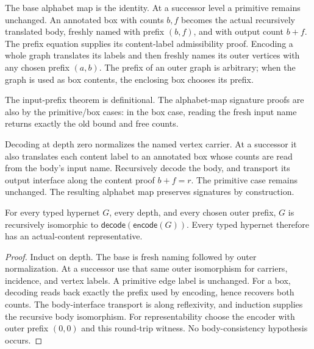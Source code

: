 \begin{definition}[Encoding]
The base alphabet map is the identity. At a successor level a primitive remains
unchanged. An annotated box with counts $b,f$ becomes the actual recursively
translated body, freshly named with prefix $(b,f)$, and with output count $b+f$.
The prefix equation supplies its content-label admissibility proof. Encoding a
whole graph translates its labels and then freshly names its outer vertices
with any chosen prefix $(a,b)$. The prefix of an outer graph is arbitrary;
when the graph is used as box contents, the enclosing box chooses its prefix.
\end{definition}
The input-prefix theorem is definitional. The alphabet-map signature proofs
are also by the primitive/box cases: in the box case, reading the fresh input
name returns exactly the old bound and free counts.


\begin{definition}[Decoding]
Decoding at depth zero normalizes the named vertex carrier. At a successor it
also translates each content label to an annotated box whose counts are read
from the body's input name. Recursively decode the body, and transport its
output interface along the content proof $b+f=r$. The primitive case remains
unchanged. The resulting alphabet map preserves signatures by construction.
\end{definition}


\begin{theorem}
For every typed hypernet $G$, every depth, and every chosen outer prefix,
$G$ is recursively isomorphic to $\mathsf{decode}(\mathsf{encode}(G))$.
Every typed hypernet therefore has an actual-content representative.
\end{theorem}
\begin{proof}
Induct on depth. The base is fresh naming followed by outer normalization.
At a successor use that same outer isomorphism for carriers, incidence, and
vertex labels. A primitive edge label is unchanged. For a box, decoding reads
back exactly the prefix used by encoding, hence recovers both counts. The
body-interface transport is along reflexivity, and induction supplies the
recursive body isomorphism. For representability choose the encoder with outer
prefix $(0,0)$ and this round-trip witness. No body-consistency hypothesis occurs.
\end{proof}

